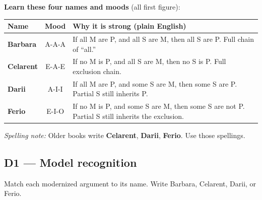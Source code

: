 \documentclass[11pt]{article}
\begin{document}
\vspace{0.2em}
\noindent\textbf{Learn these four names and moods} (all first figure):

\renewcommand{\arraystretch}{1.25}
\begin{tabularx}{\textwidth}{|l|c|X|}
\hline
\textbf{Name} & \textbf{Mood} & \textbf{Why it is strong (plain English)} \\
\hline
\textbf{Barbara} & A-A-A & If all M are P, and all S are M, then all S are P. Full chain of ``all.'' \\
\hline
\textbf{Celarent} & E-A-E & If no M is P, and all S are M, then no S is P. Full exclusion chain. \\
\hline
\textbf{Darii} & A-I-I & If all M are P, and some S are M, then some S are P. Partial S still inherits P. \\
\hline
\textbf{Ferio} & E-I-O & If no M is P, and some S are M, then some S are not P. Partial S still inherits the exclusion. \\
\hline
\end{tabularx}

\vspace{0.25em}
\noindent\textit{Spelling note:} Older books write \textbf{Celarent}, \textbf{Darii}, \textbf{Ferio}. Use those spellings.

\subsection*{D1 --- Model recognition}
\noindent Match each modernized argument to its name. Write Barbara, Celarent, Darii, or Ferio.
\end{document}
